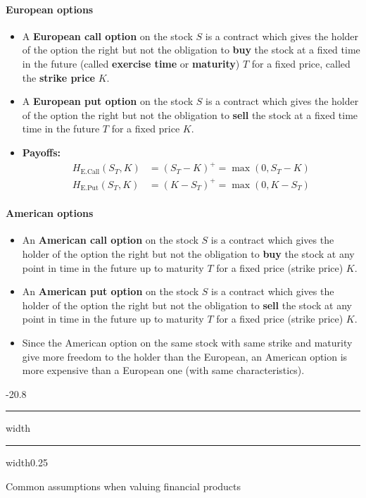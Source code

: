 \documentclass[a4paper,landscape,7pt,fleqn]{scrartcl}
\makeatletter
\renewcommand{\emph}[1]{\textbf{#1}}
\renewcommand{\subsection}{\@startsection{subsection}{1}{0mm}%
{-2\baselineskip}{0.8\baselineskip}%
{\hrule depth 0.2pt width\columnwidth\hrule depth0.75pt
width0.25\columnwidth\vspace*{1.2em}\large\bfseries}}
\makeatother
\begin{document}
\begin{multicols*}{3}
\paragraph{European options}
\begin{itemize}
\item A \emph{European call option} on the stock $S$ is a contract which gives the holder of the option the right but not the obligation to \emph{buy} the stock at a fixed time in the future (called \emph{exercise time} or \emph{maturity}) $T$ for a fixed price, called the \emph{strike price} $K$.
\item A \emph{European put option} on the stock $S$ is a contract which gives the holder of the option the right but not the obligation to \emph{sell} the stock at a fixed time time in the future $T$ for a fixed price $K$.
\item \emph{Payoffs:}
\begin{align*}
H_{\text{E.Call}}(S_T,K) &= (S_T - K)^+ = \max(0,S_T - K) \\
H_{\text{E.Put}}(S_T,K) &= (K - S_T)^+ = \max(0,K - S_T)
\end{align*}
\end{itemize}

\paragraph{American options}
\begin{itemize}
\item An \emph{American call option} on the stock $S$ is a contract which gives the holder of the option the right but not the obligation to \emph{buy} the stock at any point in time in the future up to maturity $T$ for a fixed price (strike price) $K$.
\item An \emph{American put option} on the stock $S$ is a contract which gives the holder of the option the right but not the obligation to \emph{sell} the stock at any point in time in the future up to maturity $T$ for a fixed price (strike price) $K$.
\item Since the American option on the same stock with same strike and maturity give more freedom to the holder than the European, an American option is more expensive than a European one (with same characteristics).
\end{itemize}

\subsection{Common assumptions when valuing financial products}


\end{multicols*}
\end{document}
